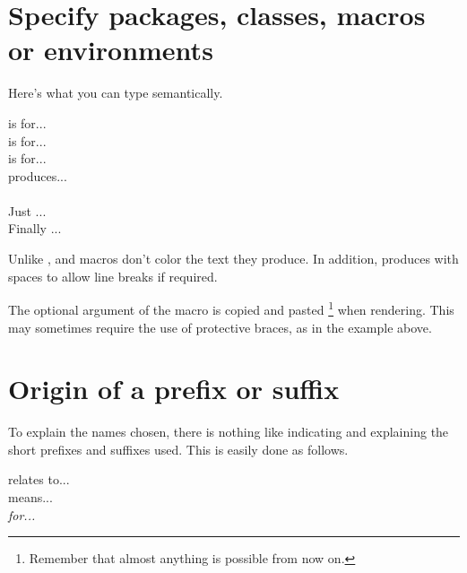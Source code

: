 


\section{Specify packages, classes, macros or environments}

Here's what you can type semantically.


\begin{tdoclatex}[sbs]
 is for...              \\
 is for...           \\
 is for...           \\
 produces...                \\
            \\
Just ...                   \\
Finally ...
\end{tdoclatex}


\begin{tdocrem}
	Unlike ,  and  macros don't color the text they produce.
    In addition,  produces  with spaces to allow line breaks if required.
\end{tdocrem}


\begin{tdocwarn}
	The optional argument of the  macro is copied and pasted
    \footnote{
        Remember that almost anything is possible from now on.
    }
    when rendering. This may sometimes require the use of protective braces, as in the example above.
\end{tdocwarn}



\section{Origin of a prefix or suffix}

To explain the names chosen, there is nothing like indicating and explaining the short prefixes and suffixes used. This is easily done as follows.


\begin{tdoclatex}[sbs]
 relates to...      \\
 means...   \\
\emph{ for...}
\end{tdoclatex}



